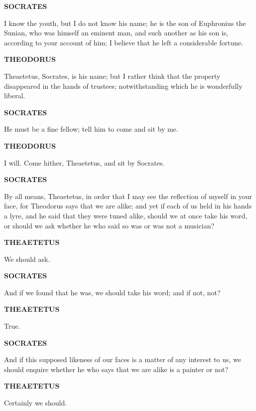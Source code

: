 \documentclass[11pt,letter]{article}
\begin{document}
\par \textbf{SOCRATES}
\par   I know the youth, but I do not know his name; he is the son of Euphronius the Sunian, who was himself an eminent man, and such another as his son is, according to your account of him; I believe that he left a considerable fortune.

\par \textbf{THEODORUS}
\par   Theaetetus, Socrates, is his name; but I rather think that the property disappeared in the hands of trustees; notwithstanding which he is wonderfully liberal.

\par \textbf{SOCRATES}
\par   He must be a fine fellow; tell him to come and sit by me.

\par \textbf{THEODORUS}
\par   I will. Come hither, Theaetetus, and sit by Socrates.

\par \textbf{SOCRATES}
\par   By all means, Theaetetus, in order that I may see the reflection of myself in your face, for Theodorus says that we are alike; and yet if each of us held in his hands a lyre, and he said that they were tuned alike, should we at once take his word, or should we ask whether he who said so was or was not a musician?

\par \textbf{THEAETETUS}
\par   We should ask.

\par \textbf{SOCRATES}
\par   And if we found that he was, we should take his word; and if not, not?

\par \textbf{THEAETETUS}
\par   True.

\par \textbf{SOCRATES}
\par   And if this supposed likeness of our faces is a matter of any interest to us, we should enquire whether he who says that we are alike is a painter or not?

\par \textbf{THEAETETUS}
\par   Certainly we should.
\end{document}
